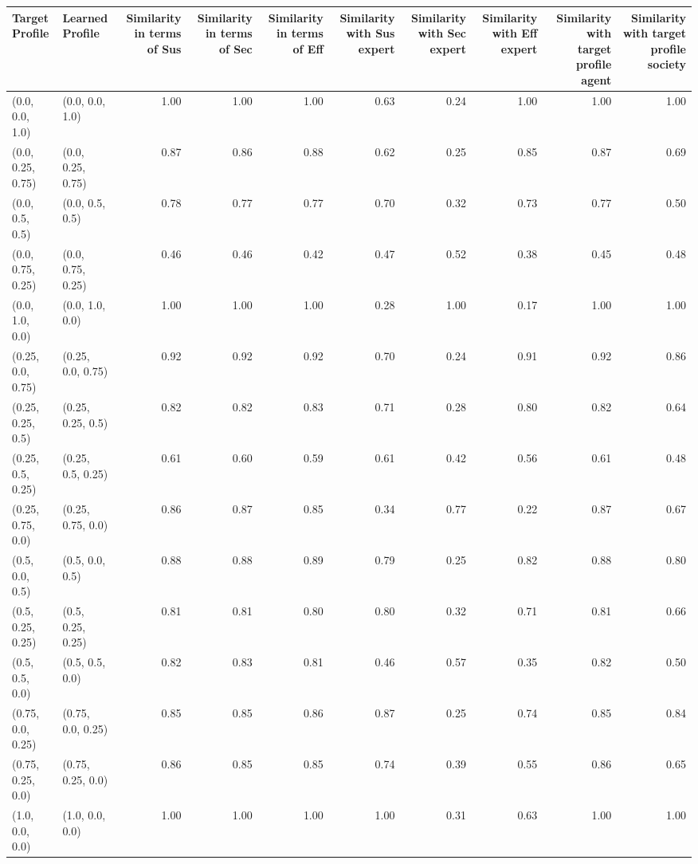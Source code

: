 \begin{tabular}{llrrrrrrrr}
\toprule
Target Profile & Learned Profile & Similarity in terms of Sus & Similarity in terms of Sec & Similarity in terms of Eff & Similarity with Sus expert & Similarity with Sec expert & Similarity with Eff expert & Similarity with target profile agent & Similarity with target profile society \\
\midrule
(0.0, 0.0, 1.0) & (0.0, 0.0, 1.0) & 1.00 & 1.00 & 1.00 & 0.63 & 0.24 & 1.00 & 1.00 & 1.00 \\
(0.0, 0.25, 0.75) & (0.0, 0.25, 0.75) & 0.87 & 0.86 & 0.88 & 0.62 & 0.25 & 0.85 & 0.87 & 0.69 \\
(0.0, 0.5, 0.5) & (0.0, 0.5, 0.5) & 0.78 & 0.77 & 0.77 & 0.70 & 0.32 & 0.73 & 0.77 & 0.50 \\
(0.0, 0.75, 0.25) & (0.0, 0.75, 0.25) & 0.46 & 0.46 & 0.42 & 0.47 & 0.52 & 0.38 & 0.45 & 0.48 \\
(0.0, 1.0, 0.0) & (0.0, 1.0, 0.0) & 1.00 & 1.00 & 1.00 & 0.28 & 1.00 & 0.17 & 1.00 & 1.00 \\
(0.25, 0.0, 0.75) & (0.25, 0.0, 0.75) & 0.92 & 0.92 & 0.92 & 0.70 & 0.24 & 0.91 & 0.92 & 0.86 \\
(0.25, 0.25, 0.5) & (0.25, 0.25, 0.5) & 0.82 & 0.82 & 0.83 & 0.71 & 0.28 & 0.80 & 0.82 & 0.64 \\
(0.25, 0.5, 0.25) & (0.25, 0.5, 0.25) & 0.61 & 0.60 & 0.59 & 0.61 & 0.42 & 0.56 & 0.61 & 0.48 \\
(0.25, 0.75, 0.0) & (0.25, 0.75, 0.0) & 0.86 & 0.87 & 0.85 & 0.34 & 0.77 & 0.22 & 0.87 & 0.67 \\
(0.5, 0.0, 0.5) & (0.5, 0.0, 0.5) & 0.88 & 0.88 & 0.89 & 0.79 & 0.25 & 0.82 & 0.88 & 0.80 \\
(0.5, 0.25, 0.25) & (0.5, 0.25, 0.25) & 0.81 & 0.81 & 0.80 & 0.80 & 0.32 & 0.71 & 0.81 & 0.66 \\
(0.5, 0.5, 0.0) & (0.5, 0.5, 0.0) & 0.82 & 0.83 & 0.81 & 0.46 & 0.57 & 0.35 & 0.82 & 0.50 \\
(0.75, 0.0, 0.25) & (0.75, 0.0, 0.25) & 0.85 & 0.85 & 0.86 & 0.87 & 0.25 & 0.74 & 0.85 & 0.84 \\
(0.75, 0.25, 0.0) & (0.75, 0.25, 0.0) & 0.86 & 0.85 & 0.85 & 0.74 & 0.39 & 0.55 & 0.86 & 0.65 \\
(1.0, 0.0, 0.0) & (1.0, 0.0, 0.0) & 1.00 & 1.00 & 1.00 & 1.00 & 0.31 & 0.63 & 1.00 & 1.00 \\
\bottomrule
\end{tabular}
